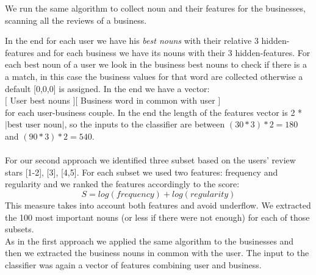 \documentclass[a4paper, 10pt, conference]{ieeeconf}      %
\begin{document}
We run the same algorithm to collect noun and their features for the businesses, scanning all the reviews of a business.

In the end for each user we have his\textit{ best nouns} with their relative 3 hidden-features and for each business we have its nouns with their 3 hidden-features. For each best noun of a user we look in the business best nouns to check if there is a a match, in this case the business values for that word are collected otherwise a default [0,0,0] is assigned.
In the end we have a vector:\\
$[$ User best nouns $]  [$ Business word in common with user $]$\\
for each user-business couple.
In the end the length of the features vector is 2 * $|\text{best user noun}|$, so the inputs to the classifier are between $(30*3)*2=180$ and $(90*3)*2=540$.\\\\
For our second approach we identified three subset based on the users' review stars [1-2], [3], [4,5]. For each subset we used two features: frequency and regularity and we ranked the features accordingly to the score:\[ S=log(frequency)+log(regularity) \]
This measure takes into account both features and avoid underflow.
We extracted the 100 most important nouns (or less if there were not enough) for each of those subsets.\\
As in the first approach we applied the same algorithm to the businesses and then we extracted the business nouns in common with the user. The input to the classifier was again a vector of features combining user and business.\\
\end{document}
